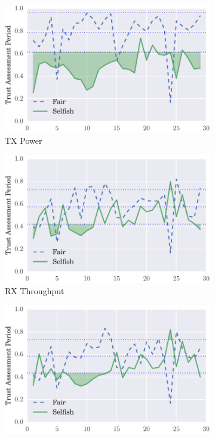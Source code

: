 \documentclass[runningheads,a4paper]{llncs}
\begin{document}
\begin{figure}
\begin{subfigure}{0.32\textwidth}
  \includegraphics[width=.95\linewidth]{img/trust_bella_allbut1_mobile_emph_ATXP_BadMouthingPowerControl.pdf}
  \caption{TX Power}
  \label{fig:allbut1_mobile_badmouthing_txp}
\end{subfigure}
\begin{subfigure}{0.32\textwidth}
\centering
  \includegraphics[width=.95\linewidth]{img/trust_bella_allbut1_mobile_emph_RXThroughput_BadMouthingPowerControl.pdf}
  \caption{RX Throughput}
  \label{fig:allbut1_mobile_badmouthing_rxthroughput}
\end{subfigure}
\begin{subfigure}{0.32\textwidth}
\centering
  \includegraphics[width=.95\linewidth]{img/trust_bella_allbut1_mobile_emph_TXThroughput_BadMouthingPowerControl.pdf}

\end{subfigure}
\end{figure}
\end{document}
